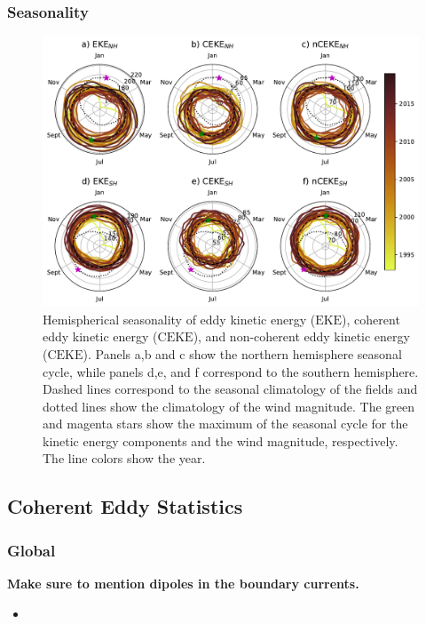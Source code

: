 \documentclass[draft,linenumbers]{agujournal2019}
\newcommand{\EKE}{\textrm{EKE}}
\newcommand{\CEKE}{\textrm{CEKE}}
\begin{document}
	\subsubsection{Seasonality}

	\begin{figure}
	    \centering
	    \includegraphics[width=1\textwidth]{figures/All_polar_plots.pdf}
	    \caption{Hemispherical seasonality of eddy kinetic energy ($\EKE$), coherent eddy kinetic energy ($\CEKE$), and non-coherent eddy kinetic energy ($\CEKE$). Panels a,b and c show the northern hemisphere seasonal cycle, while panels d,e, and f correspond to the southern hemisphere. Dashed lines correspond to the seasonal climatology of the fields and dotted lines show the climatology of the wind magnitude. The green and magenta stars show the maximum of the seasonal cycle for the kinetic energy components and the wind magnitude, respectively. The line colors show the year.}
	    \label{fig:eddy_energy_polar}
	\end{figure}
	
	\subsection{Coherent Eddy Statistics}

	\subsubsection{Global}
	
	\textbf{Make sure to mention dipoles in the boundary currents.}

    \begin{itemize}
		\item 
	\end{itemize}
\end{document}
